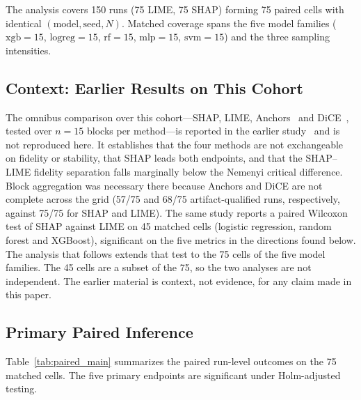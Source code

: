 \documentclass{cleiej}
\begin{document}
The analysis covers 150 runs (75 LIME, 75 SHAP) forming 75 paired cells
with identical $(\mathrm{model}, \mathrm{seed}, N)$. Matched coverage spans
the five model families ($\mathrm{xgb}=15$, $\mathrm{logreg}=15$,
$\mathrm{rf}=15$, $\mathrm{mlp}=15$, $\mathrm{svm}=15$) and the three
sampling intensities.

\subsection{Context: Earlier Results on This Cohort}

The omnibus comparison over this cohort---SHAP, LIME,
Anchors~\cite{ribeiro2018anchors} and DiCE~\cite{mothilal2020dice}, tested
over $n=15$ blocks per method---is reported in the earlier
study~\cite{herrera2026framework} and is not reproduced here. It
establishes that the four methods are not exchangeable on fidelity or
stability, that SHAP leads both endpoints, and that the SHAP--LIME fidelity
separation falls marginally below the Nemenyi critical difference. Block
aggregation was necessary there because Anchors and DiCE are not complete
across the grid (57/75 and 68/75 artifact-qualified runs, respectively,
against 75/75 for SHAP and LIME). The same study reports a paired Wilcoxon
test of SHAP against LIME on 45 matched cells (logistic regression, random
forest and XGBoost), significant on the five metrics in the directions found
below. The analysis that follows extends that test to the 75 cells of the
five model families. The 45 cells are a subset of the 75, so the two
analyses are not independent. The earlier material is context, not evidence,
for any claim made in this paper.

\subsection{Primary Paired Inference}

Table~\ref{tab:paired_main} summarizes the paired run-level outcomes on the
75 matched cells. The five primary endpoints are significant under
Holm-adjusted testing.
\end{document}
